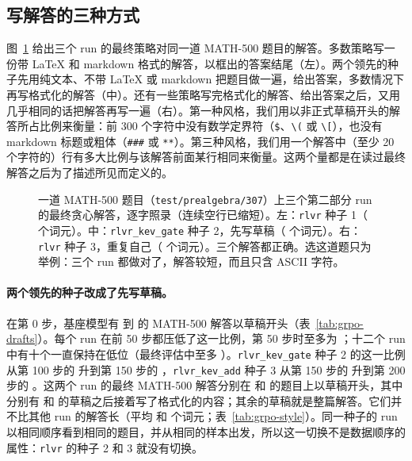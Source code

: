 \subsection{写解答的三种方式}\label{sec:res-style}

图~\ref{fig:style-example} 给出三个 run 的最终策略对同一道 MATH-500 题目的解答。多数策略写一份带 LaTeX 和 markdown 格式的解答，以框出的答案结尾（左）。两个领先的种子先用纯文本、不带 LaTeX 或 markdown 把题目做一遍，给出答案，多数情况下再写格式化的解答（中）。还有一些策略写完格式化的解答、给出答案之后，又用几乎相同的话把解答再写一遍（右）。第一种风格，我们用以非正式草稿开头的解答所占比例来衡量：前 300 个字符中没有数学定界符（\texttt{\$}、\texttt{\textbackslash(} 或 \texttt{\textbackslash[}），也没有 markdown 标题或粗体（\texttt{\#\#\#} 或 \texttt{**}）。第三种风格，我们用一个解答中（至少 20 个字符的）行有多大比例与该解答前面某行相同来衡量。这两个量都是在读过最终解答之后为了描述所见而定义的。

\begin{figure}[t]
\centering

\caption{一道 MATH-500 题目（\texttt{test/prealgebra/307}）上三个第二部分 run 的最终贪心解答，逐字照录（连续空行已缩短）。左：\texttt{rlvr} 种子 1（ 个词元）。中：\texttt{rlvr\_kev\_gate} 种子 2，先写草稿（ 个词元）。右：\texttt{rlvr} 种子 3，重复自己（ 个词元）。三个解答都正确。选这道题只为举例：三个 run 都做对了，解答较短，而且只含 ASCII 字符。}
\label{fig:style-example}
\end{figure}

\paragraph{两个领先的种子改成了先写草稿。} 在第 0 步，基座模型有  到  的 MATH-500 解答以草稿开头（表~\ref{tab:grpo-drafts}）。每个 run 在前 50 步都压低了这一比例，第 50 步时至多为 ；十二个 run 中有十个一直保持在低位（最终评估中至多 ）。\texttt{rlvr\_kev\_gate} 种子 2 的这一比例从第 100 步的  升到第 150 步的 ，\texttt{rlvr\_kev\_add} 种子 3 从第 150 步的  升到第 200 步的 。这两个 run 的最终 MATH-500 解答分别在  和  的题目上以草稿开头，其中分别有  和  的草稿之后接着写了格式化的内容；其余的草稿就是整篇解答。它们并不比其他 run 的解答长（平均  和  个词元；表~\ref{tab:grpo-style}）。同一种子的 run 以相同顺序看到相同的题目，并从相同的样本出发，所以这一切换不是数据顺序的属性：\texttt{rlvr} 的种子 2 和 3 就没有切换。

